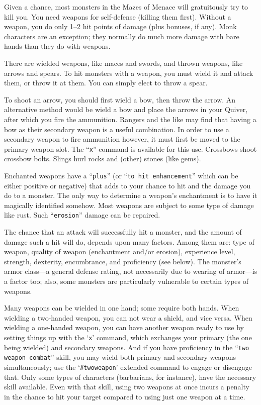 
Given a chance, most monsters in the Mazes of Menace will gratuitously try to
kill you.  You need weapons for self-defense (killing them first).  Without a
weapon, you do only 1--2 hit points of damage (plus bonuses, if any).
Monk characters are an exception; they normally do much more damage with
bare hands than they do with weapons.

There are wielded weapons, like maces and swords, and thrown weapons,
like arrows and spears.  To hit monsters with a weapon, you must wield it and
attack them, or throw it at them.  You can simply elect to throw a spear.

To shoot an arrow, you should first wield a bow, then throw the arrow.
An alternative method would be wield a bow and place the arrows in your
Quiver, after which you fire the ammunition.
Rangers and the like may find that having a bow as their secondary weapon
is a useful combination. In order to use a secondary weapon to fire ammunition
however, it must first be moved to the primary weapon slot. The ``{\tt x}'' command
is available for this use.
Crossbows shoot crossbow bolts.  Slings hurl rocks and (other) stones
(like gems).

Enchanted weapons have a ``{\tt plus}'' (or ``{\tt to hit enhancement}'' which can be
either positive or negative) that adds to your chance to
hit and the damage you do to a monster.  The only way to determine a weapon's
enchantment is to have it magically identified somehow.
Most weapons are subject to some type of damage like rust.  Such
``{\tt erosion}'' damage can be repaired.

The chance that an attack will successfully hit a monster, and the amount
of damage such a hit will do, depends upon many factors.  Among them are:
type of weapon, quality of weapon (enchantment and/or erosion), experience
level, strength, dexterity, encumbrance, and proficiency (see below).  The
monster's armor class---a general defense rating, not necessarily due to
wearing of armor---is a factor too; also, some monsters are particularly
vulnerable to certain types of weapons.

Many weapons can be wielded in one hand; some require both hands.
When wielding a two-handed weapon, you can not wear a shield, and
vice versa.  When wielding a one-handed weapon, you can have another
weapon ready to use by setting things up with the `{\tt x}' command, which
exchanges your primary (the one being wielded) and secondary weapons.
And if you have proficiency in the ``{\tt two weapon combat}'' skill, you
may wield both primary and secondary weapons simultaneously; use the
`{\tt \#twoweapon}' extended command to engage or disengage that.  Only
some types of characters (barbarians, for instance), have the necessary
skill available.  Even with that skill, using two weapons at once incurs
a penalty in the chance to hit your target compared to using just one
weapon at a time.

